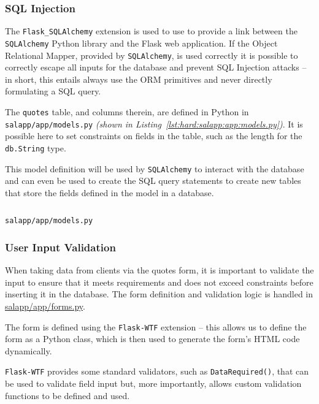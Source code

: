 \subsubsection{SQL Injection}

The \texttt{Flask\_SQLAlchemy} extension is used to use to provide a link between the \texttt{SQLAlchemy} Python library and the Flask web application. If the Object Relational Mapper, provided by \texttt{SQLAlchemy}, is used correctly it is possible to correctly escape all inputs for the database and prevent SQL Injection attacks -- in short, this entails always use the ORM primitives and never directly formulating a SQL query.

The \texttt{quotes} table, and columns therein, are defined in Python in \texttt{salapp/app/models.py} \textit{(shown in Listing~\ref{lst:hard:salapp:app:models.py})}. It is possible here to set constraints on fields in the table, such as the length for the \texttt{db.String} type.

This model definition will be used by \texttt{SQLAlchemy} to interact with the database and can even be used to create the SQL query statements to create new tables that store the fields defined in the model in a database.
\begin{listing}[H]
  \captionsetup{skip=\skiplistingcaptionlen}
  \inputminted[breakanywhere,firstline=5]{python3}{../uswacs-2-iy2d502-salapp/app/models.py}
  \caption{\texttt{salapp/app/models.py}}
  \label{lst:hard:salapp:app:models.py}
\end{listing}

\subsubsection{User Input Validation}
When taking data from clients via the quotes form, it is important to validate the input to ensure that it meets requirements and does not exceed constraints before inserting it in the database. The form definition and validation logic is handled in \hyperref[fcl:uswacs-2-iy2d502-salapp:forms.py]{salapp/app/forms.py}.

The form is defined using the \texttt{Flask-WTF} extension -- this allows us to define the form as a Python class, which is then used to generate the form's HTML code dynamically.

\texttt{Flask-WTF} provides some standard validators, such as \texttt{DataRequired()}, that can be used to validate field input but, more importantly, allows custom validation functions to be defined and used.

